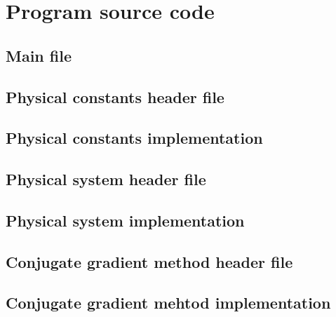 \appendix
\chapter{Program source code}
\label{ap:source_code}
\section{Main file}



\section{Physical constants header file}



\section{Physical constants implementation}



\section{Physical system header file}



\section{Physical system implementation}



\section{Conjugate gradient method header file}



\section{Conjugate gradient mehtod implementation}



